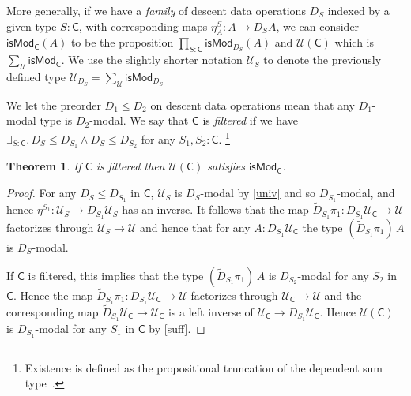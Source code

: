 \documentclass[10pt,a4paper,draft]{article}
\newcommand{\UU}{\mathcal{U}}%
\newcommand{\Cov}{\mathsf{C}}%
\newcommand{\GG}{\mathsf{isMod}}
\newcommand{\D}{D}              %
\newcommand{\DD}{\tilde{D}} %
\renewcommand{\~}{\widetilde}
\newcounter{diagram}
\newtheorem{theorem}{Theorem}[section]
\theoremstyle{definition}
\theoremstyle{remark} %
\begin{document}
More generally, if we have a {\em family} of descent data operations $\D_S$ indexed
by a given type $S:\Cov$, with corresponding maps $\eta^S_A:A\rightarrow \D_SA$,
we can consider $\GG_{\Cov}(A)$ to be the proposition $\prod_{S:\Cov} \GG_{\D_S}(A)$
and $\UU(\Cov)$ which is $\sum_{\UU}\GG_{\Cov}$. We use the slightly shorter notation $\UU_S$ to denote the previously defined type $\UU_{\D_S} = \sum_{\UU}\GG_{\D_S}$

We let the preorder $\D_1\leqslant \D_2$ on descent data operations mean that any $\D_1$\hyp{}modal
type is $\D_2$\hyp{}modal. We say that $\Cov$ is {\em filtered} if we have
$\exists_{S:\Cov}.\,\D_S\leqslant \D_{S_1}\wedge \D_S\leqslant \D_{S_2}$ for any
$S_1, S_2:\Cov$.%
\footnote{Existence is defined as the propositional truncation of the dependent sum type~\cite{HoTT}.}

\begin{theorem}\label{filter}
If $\Cov$ is filtered then $\UU(\Cov)$ satisfies $\GG_{\Cov}$.
\end{theorem}

\begin{proof}
  For any $\D_S\leqslant \D_{S_1}$ in $\Cov$, $\UU_S$ is $\D_S$\hyp{}modal by \cref{univ}
  and so $\D_{S_1}$\hyp{}modal,
  and hence $\eta^{S_1}:\UU_{S}\rightarrow \D_{S_1}\UU_{S}$ has an inverse.
  It follows that the map $\DD_{S_1}\pi_1:\D_{S_1}\UU_{\Cov}\rightarrow \UU$
  factorizes through $\UU_S\rightarrow\UU$ and
  hence that for any $A:\D_{S_1}\UU_{\Cov}$ the type $(\DD_{S_1}\pi_1)\,A$
  is $\D_S$\hyp{}modal.

  If $\Cov$ is filtered, this implies that the type
  $(\DD_{S_1}\pi_1)\,A$ is $\D_{S_2}$\hyp{}modal for any $S_2$ in $\Cov$. Hence
  the map $\DD_{S_1}\pi_1:\D_{S_1}\UU_{\Cov}\rightarrow \UU$
  factorizes through $\UU_{\Cov}\rightarrow \UU$
  and the corresponding map $\DD_{S_1}\UU_{\Cov}\rightarrow\UU_{\Cov}$
  is a left inverse of $\UU_{\Cov}\rightarrow \D_{S_1}\UU_{\Cov}$.
  Hence $\UU(\Cov)$ is $\D_{S_1}$\hyp{}modal for any $S_1$ in $\Cov$
  by \cref{suff}.
\end{proof}
\end{document}
